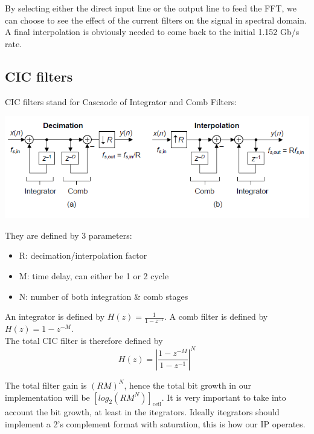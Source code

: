 \documentclass{article}
\begin{document}
By selecting either the direct input line
or the output line to feed the FFT, we
can choose to see the effect of the current filters
on the signal in spectral domain. \\

A final interpolation is obviously
needed to come back to the initial 1.152 Gb/s rate.

\newpage
\subsection{CIC filters}

CIC filters stand for Cascaode of Integrator and Comb Filters:
\begin{center}
	\includegraphics[width=0.75\linewidth]{CIC_digital_filters_fig6.png} \\
\end{center}

They are defined by 3 parameters:
\begin{itemize}
	\item R: decimation/interpolation factor
	\item M: time delay, can either be 1 or 2 cycle
	\item N: number of both integration \& comb stages
\end{itemize}

An integrator is defined by $H(z) = \frac{1}{1 - z^{-1}}$.
A comb filter is defined by $H(z) = 1 - z^{-M}$. \\

The total CIC filter is therefore defined by 
\begin{equation}
	H(z) = \left| \frac{1 - z^{-M}}{1 - z^{-1}} \right|^N
\end{equation}

The total filter gain is $(RM)^N$,
hence the total bit growth in our implementation
will be $\left[ log_2\left(RM^N\right) \right]_\text{ceil}$.
It is very important to take into account the bit growth, at least in the
itegrators. Ideally itegrators should implement a 2's complement format
with saturation, this is how our IP operates. \\
\end{document}
